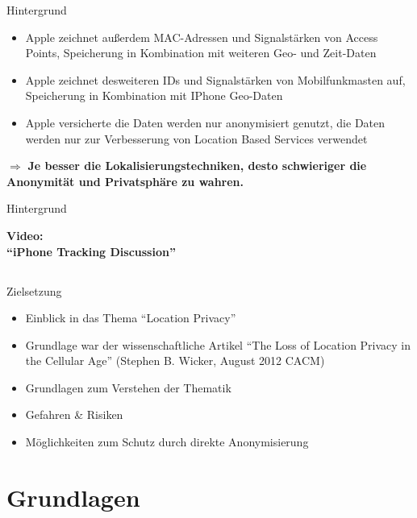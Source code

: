\begin{frame}{Hintergrund}
\begin{itemize}
  \item Apple zeichnet außerdem MAC-Adressen und Signalstärken von Access Points, Speicherung in Kombination mit weiteren Geo- und Zeit-Daten
  \item Apple zeichnet desweiteren IDs und Signalstärken von Mobilfunkmasten auf, Speicherung in Kombination mit IPhone Geo-Daten
  \item Apple versicherte die Daten werden nur anonymisiert genutzt, die Daten werden nur zur Verbesserung von Location Based Services verwendet
\end{itemize}
$\Rightarrow$ \textbf{Je besser die Lokalisierungstechniken, desto schwieriger die Anonymität und Privatsphäre zu wahren.}
\end{frame}

\begin{frame}{Hintergrund}
\begin{center}
  \huge \textbf{Video:\\\vspace{1cm} "`iPhone Tracking Discussion"'}
\end{center}
\vspace{2cm}
\begin{center}
  \href{run:iphone.mp4}{}
\end{center}
\end{frame}

\subsection{}
\begin{frame}{Zielsetzung}
\begin{itemize}
  \item Einblick in das Thema "`Location Privacy"'
  \item Grundlage war der wissenschaftliche Artikel "`The Loss of Location Privacy in the Cellular Age"' (Stephen B. Wicker, August 2012 CACM)
  \item Grundlagen zum Verstehen der Thematik
  \item Gefahren \& Risiken
  \item Möglichkeiten zum Schutz durch direkte Anonymisierung
\end{itemize}
\end{frame}

\section{Grundlagen}
